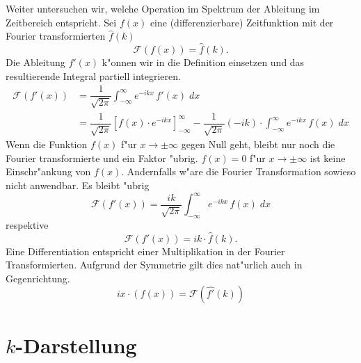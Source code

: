 \begin{refsection}
Weiter untersuchen wir, welche Operation im Spektrum der Ableitung im Zeitbereich entspricht.
Sei $f(x)$ eine (differenzierbare) Zeitfunktion mit der Fourier transformierten $\hat{f}(k)$
\begin{equation}
\mathcal{F}(f(x)) = \hat{f}(k).
\end{equation}
Die Ableitung $f'(x)$ k"onnen wir in die Definition einsetzen und das resultierende Integral partiell integrieren. 
\begin{align}
\mathcal{F}(f'(x)) &= \dfrac{1}{\sqrt{2\pi}}\int_{-\infty}^{\infty}e^{-i k x} \, f'(x) \; dx\\
&= \dfrac{1}{\sqrt{2\pi}}\left[f(x)\cdot e^{-i k x} \right]_{-\infty}^{\infty}-  \dfrac{1}{\sqrt{2\pi}}(-ik)\cdot\int_{-\infty}^{\infty}e^{-i k x} \, f(x) \; dx
\end{align}
Wenn die Funktion $f(x)$ f"ur $x \rightarrow \pm \infty$ gegen Null geht, bleibt nur noch die Fourier transformierte und ein Faktor "ubrig.
$f(x) = 0$ f"ur  $x \rightarrow \pm \infty$ ist keine Einschr"ankung von $f(x)$.
Andernfalls w"are die Fourier Transformation sowieso nicht anwendbar.
Es bleibt "ubrig
\begin{equation}
\mathcal{F}(f'(x))= \dfrac{ik}{\sqrt{2\pi}}\int_{-\infty}^{\infty}e^{-i k x} \, f(x) \; dx
\end{equation}
respektive
\begin{equation}
\mathcal{F}(f'(x))= ik\cdot\hat{f}(k).
\end{equation}
Eine Differentiation entspricht einer Multiplikation in der Fourier Transformierten.
Aufgrund der Symmetrie gilt dies nat"urlich auch in Gegenrichtung.
\begin{equation}
ix\cdot(f(x))= \mathcal{F}(\hat{f'}(k))
\end{equation}

\section{$k$-Darstellung}



\end{refsection}
